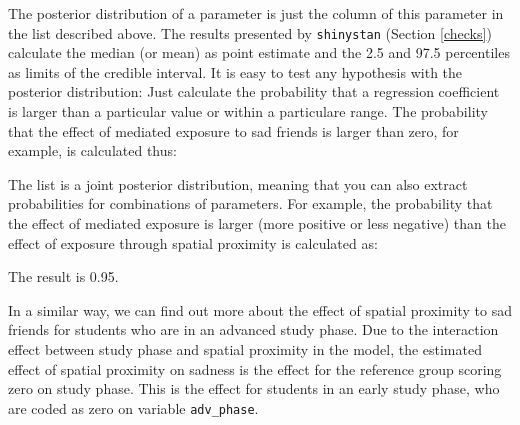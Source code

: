 \documentclass[
  english,
  doc]{apa6}
\newenvironment{Shaded}{\begin{snugshade}}{\end{snugshade}}
\newcommand{\DataTypeTok}[1]{\textcolor[rgb]{0.13,0.29,0.53}{#1}}
\newcommand{\DecValTok}[1]{\textcolor[rgb]{0.00,0.00,0.81}{#1}}
\newcommand{\KeywordTok}[1]{\textcolor[rgb]{0.13,0.29,0.53}{\textbf{#1}}}
\newcommand{\NormalTok}[1]{#1}
\newcommand{\OperatorTok}[1]{\textcolor[rgb]{0.81,0.36,0.00}{\textbf{#1}}}
\newcommand{\StringTok}[1]{\textcolor[rgb]{0.31,0.60,0.02}{#1}}
\begin{document}
The posterior distribution of a parameter is just the column of this parameter in the list described above. The results presented by \texttt{shinystan} (Section \ref{checks}) calculate the median (or mean) as point estimate and the 2.5 and 97.5 percentiles as limits of the credible interval. It is easy to test any hypothesis with the posterior distribution: Just calculate the probability that a regression coefficient is larger than a particular value or within a particulare range. The probability that the effect of mediated exposure to sad friends is larger than zero, for example, is calculated thus:

\begin{Shaded}
\end{Shaded}

The list is a joint posterior distribution, meaning that you can also extract probabilities for combinations of parameters. For example, the probability that the effect of mediated exposure is larger (more positive or less negative) than the effect of exposure through spatial proximity is calculated as:

\begin{Shaded}
\end{Shaded}

The result is 0.95.

In a similar way, we can find out more about the effect of spatial proximity to sad friends for students who are in an advanced study phase. Due to the interaction effect between study phase and spatial proximity in the model, the estimated effect of spatial proximity on sadness is the effect for the reference group scoring zero on study phase. This is the effect for students in an early study phase, who are coded as zero on variable \texttt{adv\_phase}.
\end{document}
